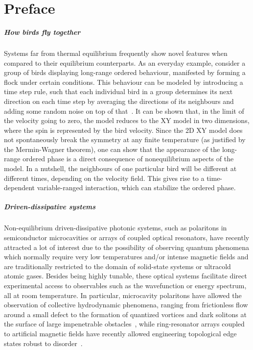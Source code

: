 \chapter*{Preface}

\paragraph{How birds fly together}
Systems far from thermal equilibrium frequently show novel features
when compared to their equilibrium counterparts. As an everyday
example, consider a group of birds displaying long-range ordered
behaviour, manifested by forming a flock under certain
conditions. This behaviour can be modeled by introducing a time step
rule, such that each individual bird in a group determines its next
direction on each time step by averaging the directions of its
neighbours and adding some random noise on top of
that~\cite{Toner1995}. It can be shown that, in the limit of the
velocity going to zero, the model reduces to the XY model in two
dimensions, where the spin is represented by the bird velocity. Since
the 2D XY model does not spontaneously break the symmetry at any
finite temperature (as justified by the Mermin-Wagner theorem), one
can show that the appearance of the long-range ordered phase is a
direct consequence of nonequilibrium aspects of the model. In a
nutshell, the neighbours of one particular bird will be different at
different times, depending on the velocity field. This gives rise to a
time-dependent variable-ranged interaction, which can stabilize the
ordered phase.

\paragraph{Driven-dissipative systems}
Non-equilibrium driven-dissipative photonic systems, such as
polaritons in semiconductor microcavities or arrays of coupled optical
resonators, have recently attracted a lot of interest due to the
possibility of observing quantum phenomena which normally require very
low temperatures and/or intense magnetic fields and are traditionally
restricted to the domain of solid-state systems or ultracold atomic
gases. Besides being highly tunable, these optical systems facilitate
direct experimental access to observables such as the wavefunction or
energy spectrum, all at room temperature. In particular, microcavity
polaritons have allowed the observation of collective hydrodynamic
phenomena, ranging from frictionless flow around a small defect to the
formation of quantized vortices and dark solitons at the surface of
large impenetrable obstacles~\cite{Carusotto_2013}, while
ring-resonator arrays coupled to artificial magnetic fields have
recently allowed engineering topological edge states robust to
disorder~\cite{hafezi2013imaging}.


